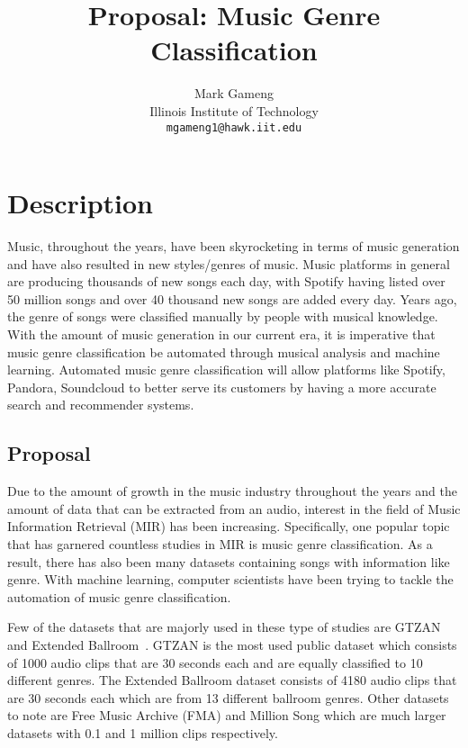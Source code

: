 \documentclass[10pt,twocolumn,letterpaper]{article}
\begin{document}
	
	\title{Proposal: Music Genre Classification}
	
	\author{Mark Gameng\\
		Illinois Institute of Technology\\
		{\tt\small mgameng1@hawk.iit.edu}
	}
	
	\maketitle
	
	\section{Description}
	
	Music, throughout the years, have been skyrocketing in terms of music generation and have also resulted in new styles/genres of music. Music platforms in general are producing thousands of new songs each day, with Spotify having listed over 50 million songs and over 40 thousand new songs are added every day. Years ago, the genre of songs were classified manually by people with musical knowledge. With the amount of music generation in our current era, it is imperative that music genre classification be automated through musical analysis and machine learning. Automated music genre classification will allow platforms like Spotify, Pandora, Soundcloud to better serve its customers by having a more accurate search and recommender systems.
	
	\subsection{Proposal}
	
	Due to the amount of growth in the music industry throughout the years and the amount of data that can be extracted from an audio, interest in the field of Music Information Retrieval (MIR) has been increasing. Specifically, one popular topic that has garnered countless studies in MIR is music genre classification. As a result, there has also been many datasets containing songs with information like genre. With machine learning, computer scientists have been trying to tackle the automation of music genre classification.
	
	Few of the datasets that are majorly used in these type of studies are GTZAN~\cite{tzanetakis2002musical} and Extended Ballroom~\cite{marchand2016extended}. GTZAN is the most used public dataset which consists of 1000 audio clips that are 30 seconds each and are equally classified to 10 different genres. The Extended Ballroom dataset consists of 4180 audio clips that are 30 seconds each which are from 13 different ballroom genres. Other datasets to note are Free Music Archive (FMA) and Million Song which are much larger datasets with 0.1 and 1 million clips respectively.
	
\end{document}
